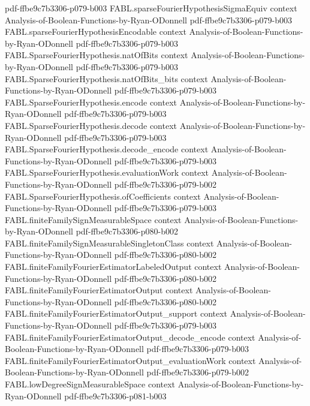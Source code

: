 \begin{theorem}
  {pdf-ffbe9c7b3306-p079-b003}
\proofstep
  {FABL.sparseFourierHypothesisSigmaEquiv}
  {context}
  {Analysis-of-Boolean-Functions-by-Ryan-ODonnell}
  {pdf-ffbe9c7b3306-p079-b003}
\proofstep
  {FABL.sparseFourierHypothesisEncodable}
  {context}
  {Analysis-of-Boolean-Functions-by-Ryan-ODonnell}
  {pdf-ffbe9c7b3306-p079-b003}
\proofstep
  {FABL.SparseFourierHypothesis.natOfBits}
  {context}
  {Analysis-of-Boolean-Functions-by-Ryan-ODonnell}
  {pdf-ffbe9c7b3306-p079-b003}
\proofstep
  {FABL.SparseFourierHypothesis.natOfBits_bits}
  {context}
  {Analysis-of-Boolean-Functions-by-Ryan-ODonnell}
  {pdf-ffbe9c7b3306-p079-b003}
\proofstep
  {FABL.SparseFourierHypothesis.encode}
  {context}
  {Analysis-of-Boolean-Functions-by-Ryan-ODonnell}
  {pdf-ffbe9c7b3306-p079-b003}
\proofstep
  {FABL.SparseFourierHypothesis.decode}
  {context}
  {Analysis-of-Boolean-Functions-by-Ryan-ODonnell}
  {pdf-ffbe9c7b3306-p079-b003}
\proofstep
  {FABL.SparseFourierHypothesis.decode_encode}
  {context}
  {Analysis-of-Boolean-Functions-by-Ryan-ODonnell}
  {pdf-ffbe9c7b3306-p079-b003}
\proofstep
  {FABL.SparseFourierHypothesis.evaluationWork}
  {context}
  {Analysis-of-Boolean-Functions-by-Ryan-ODonnell}
  {pdf-ffbe9c7b3306-p079-b002}
\proofstep
  {FABL.SparseFourierHypothesis.ofCoefficients}
  {context}
  {Analysis-of-Boolean-Functions-by-Ryan-ODonnell}
  {pdf-ffbe9c7b3306-p079-b003}
\proofstep
  {FABL.finiteFamilySignMeasurableSpace}
  {context}
  {Analysis-of-Boolean-Functions-by-Ryan-ODonnell}
  {pdf-ffbe9c7b3306-p080-b002}
\proofstep
  {FABL.finiteFamilySignMeasurableSingletonClass}
  {context}
  {Analysis-of-Boolean-Functions-by-Ryan-ODonnell}
  {pdf-ffbe9c7b3306-p080-b002}
\proofstep
  {FABL.finiteFamilyFourierEstimatorLabeledOutput}
  {context}
  {Analysis-of-Boolean-Functions-by-Ryan-ODonnell}
  {pdf-ffbe9c7b3306-p080-b002}
\proofstep
  {FABL.finiteFamilyFourierEstimatorOutput}
  {context}
  {Analysis-of-Boolean-Functions-by-Ryan-ODonnell}
  {pdf-ffbe9c7b3306-p080-b002}
\proofstep
  {FABL.finiteFamilyFourierEstimatorOutput_support}
  {context}
  {Analysis-of-Boolean-Functions-by-Ryan-ODonnell}
  {pdf-ffbe9c7b3306-p079-b003}
\proofstep
  {FABL.finiteFamilyFourierEstimatorOutput_decode_encode}
  {context}
  {Analysis-of-Boolean-Functions-by-Ryan-ODonnell}
  {pdf-ffbe9c7b3306-p079-b003}
\proofstep
  {FABL.finiteFamilyFourierEstimatorOutput_evaluationWork}
  {context}
  {Analysis-of-Boolean-Functions-by-Ryan-ODonnell}
  {pdf-ffbe9c7b3306-p079-b002}
\proofstep
  {FABL.lowDegreeSignMeasurableSpace}
  {context}
  {Analysis-of-Boolean-Functions-by-Ryan-ODonnell}
  {pdf-ffbe9c7b3306-p081-b003}

\end{theorem}
